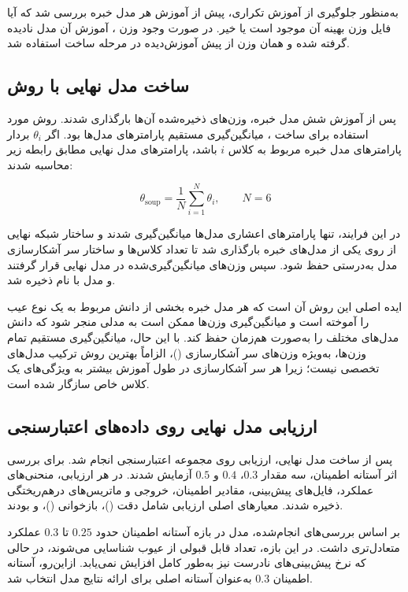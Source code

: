 \documentclass[a4paper, 10pt, twocolumn]{article}
\begin{document}
	به‌منظور جلوگیری از آموزش تکراری، پیش از آموزش هر مدل خبره بررسی شد که
	آیا فایل وزن بهینه آن موجود است یا خیر. در صورت وجود وزن ،
	آموزش آن مدل نادیده گرفته شده و همان وزن از پیش آموزش‌دیده در مرحله ساخت
	 استفاده شد.
	
	\subsection{ساخت مدل نهایی با روش }
	
	پس از آموزش شش مدل خبره، وزن‌های ذخیره‌شده آن‌ها بارگذاری شدند. روش مورد
	استفاده برای ساخت ، میانگین‌گیری مستقیم پارامترهای مدل‌ها
	بود. اگر \(\theta_i\) بردار پارامترهای مدل خبره مربوط به کلاس \(i\) باشد،
	پارامترهای مدل نهایی مطابق رابطه زیر محاسبه شدند:
	
	\[
	\theta_{\text{soup}} =
	\frac{1}{N}\sum_{i=1}^{N}\theta_i,
	\qquad N=6
	\]
	
	در این فرایند، تنها پارامترهای اعشاری مدل‌ها میانگین‌گیری شدند و ساختار
	شبکه نهایی از روی یکی از مدل‌های خبره بارگذاری شد تا تعداد کلاس‌ها و
	ساختار سر آشکارسازی مدل به‌درستی حفظ شود. سپس وزن‌های میانگین‌گیری‌شده
	در مدل نهایی قرار گرفتند و مدل با نام  ذخیره شد.
	
	ایده اصلی این روش آن است که هر مدل خبره بخشی از دانش مربوط به یک نوع عیب
	را آموخته است و میانگین‌گیری وزن‌ها ممکن است به مدلی منجر شود که دانش
	مدل‌های مختلف را به‌صورت هم‌زمان حفظ کند. با این حال، میانگین‌گیری مستقیم
	تمام وزن‌ها، به‌ویژه وزن‌های سر آشکارسازی ()، الزاماً
	بهترین روش ترکیب مدل‌های تخصصی نیست؛ زیرا هر سر آشکارسازی در طول آموزش
	بیشتر به ویژگی‌های یک کلاس خاص سازگار شده است.
	
	\subsection{ارزیابی مدل نهایی روی داده‌های اعتبارسنجی}
	
	پس از ساخت مدل نهایی، ارزیابی روی مجموعه اعتبارسنجی انجام شد. برای بررسی
	اثر آستانه اطمینان، سه مقدار \(0.3\)، \(0.4\) و \(0.5\) آزمایش شدند.
	در هر ارزیابی، منحنی‌های عملکرد، فایل‌های پیش‌بینی، مقادیر اطمینان،
	خروجی  و ماتریس‌های درهم‌ریختگی ذخیره شدند. معیارهای اصلی
	ارزیابی شامل دقت ()، بازخوانی ()،
	 و  بودند.
	
	بر اساس بررسی‌های انجام‌شده، مدل در بازه آستانه اطمینان حدود
	\(0.25\) تا \(0.3\) عملکرد متعادل‌تری داشت. در این بازه، تعداد قابل قبولی
	از عیوب شناسایی می‌شوند، در حالی که نرخ پیش‌بینی‌های نادرست نیز به‌طور
	کامل افزایش نمی‌یابد. ازاین‌رو، آستانه اطمینان \(0.3\) به‌عنوان آستانه
	اصلی برای ارائه نتایج مدل  انتخاب شد.
	
\end{document}
